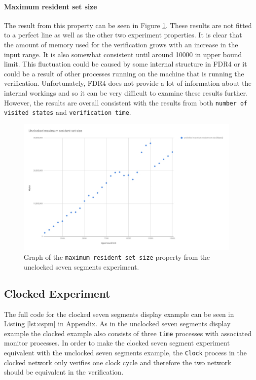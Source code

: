 \paragraph{Maximum resident set size}
The result from this property can be seen in Figure \ref{fig:unclocked_resident_size}. These results are not fitted to a perfect line as well as the other two experiment properties. It is clear that the amount of memory used for the verification grows with an increase in the input range. It is also somewhat consistent until around 10000 in upper bound limit. This fluctuation could be caused by some internal structure in FDR4 or it could be a result of other processes running on the machine that is running the verification. Unfortunately, FDR4 does not provide a lot of information about the internal workings and so it can be very difficult to examine these results further. However, the results are overall consistent with the results from both \texttt{number of visited states} and \texttt{verification time}.
\begin{figure}
    \includegraphics[width=0.98\textwidth]{./figures/temporary_graphs/unclocked_maximum_resident_set_size.jpg}
\caption{Graph of the \texttt{maximum resident set size} property from the unclocked seven segments experiment.}
\label{fig:unclocked_resident_size}
\end{figure}

\subsection{Clocked Experiment}
The full code for the clocked seven segments display example can be seen in Listing \ref{lst:cspm} in Appendix. %
As in the unclocked seven segments display example the clocked example also consists of three \texttt{time} processes with associated monitor processes.
In order to make the clocked seven segment experiment equivalent with the unclocked seven segments example, the \texttt{Clock} process in the clocked network only verifies one clock cycle and therefore the two network should be equivalent in the verification.
